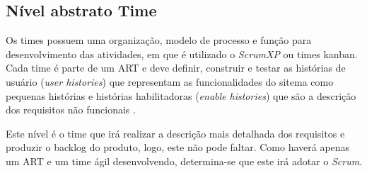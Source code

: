 \subsection{Nível abstrato Time}

Os times possuem uma organização, modelo de processo e função para desenvolvimento das atividades, em que é utilizado o \textit{ScrumXP} ou times kanban. Cada time é parte de um ART e deve definir, construir e testar as histórias de usuário (\textit{user histories}) que representam as funcionalidades do sitema como pequenas histórias e histórias habilitadoras (\textit{enable histories}) que são a descrição dos requisitos não funcionais \cite{safe}.

Este nível é o time que irá realizar a descrição mais detalhada dos requisitos e produzir o backlog do produto, logo, este não pode faltar. Como haverá apenas um ART e um time ágil desenvolvendo, determina-se que este irá adotar o \textit{Scrum}.
